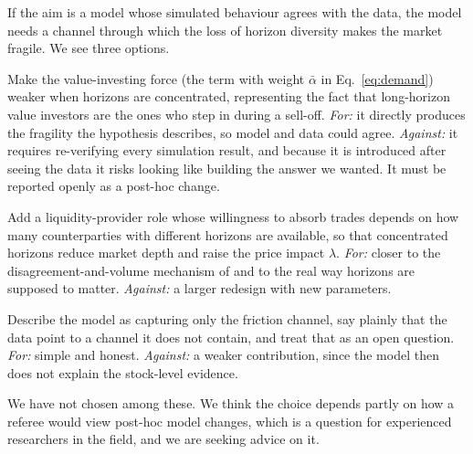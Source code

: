 If the aim is a model whose simulated behaviour agrees with the data, the model needs a channel through which the loss of horizon diversity makes the market fragile. We see three options.

\begin{description}[leftmargin=1.2em,style=nextline]
\item[Option A: a horizon-dependent stabiliser.] Make the value-investing force (the term with weight $\bar\alpha$ in Eq.~\eqref{eq:demand}) weaker when horizons are concentrated, representing the fact that long-horizon value investors are the ones who step in during a sell-off. \emph{For:} it directly produces the fragility the hypothesis describes, so model and data could agree. \emph{Against:} it requires re-verifying every simulation result, and because it is introduced after seeing the data it risks looking like building the answer we wanted. It must be reported openly as a post-hoc change.
\item[Option B: horizon-dependent liquidity.] Add a liquidity-provider role whose willingness to absorb trades depends on how many counterparties with different horizons are available, so that concentrated horizons reduce market depth and raise the price impact $\lambda$. \emph{For:} closer to the disagreement-and-volume mechanism of \citet{harrisraviv1993} and to the real way horizons are supposed to matter. \emph{Against:} a larger redesign with new parameters.
\item[Option C: keep the model and report the tension.] Describe the model as capturing only the friction channel, say plainly that the data point to a channel it does not contain, and treat that as an open question. \emph{For:} simple and honest. \emph{Against:} a weaker contribution, since the model then does not explain the stock-level evidence.
\end{description}

We have not chosen among these. We think the choice depends partly on how a referee would view post-hoc model changes, which is a question for experienced researchers in the field, and we are seeking advice on it.
